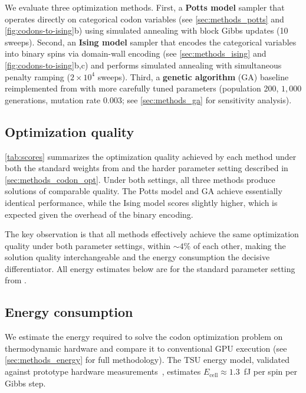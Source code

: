 \documentclass[11pt,twocolumn]{article}
\begin{document}
We evaluate three optimization methods.
First, a \textbf{Potts model} sampler that operates directly on categorical codon variables (see \cref{sec:methods_potts} and \cref{fig:codons-to-ising}b) using simulated annealing with block Gibbs updates (10 sweeps).
Second, an \textbf{Ising model} sampler that encodes the categorical variables into binary spins via domain-wall encoding (see \cref{sec:methods_ising} and \cref{fig:codons-to-ising}b,c) and performs simulated annealing with simultaneous penalty ramping ($2 \times 10^4$ sweeps).
Third, a \textbf{genetic algorithm} (GA) baseline reimplemented from \cite{fox2021mrna} with more carefully tuned parameters (population 200, $1{,}000$ generations, mutation rate $0.003$; see \cref{sec:methods_ga} for sensitivity analysis).

\subsection{Optimization quality}\label{sec:results_quality}

\cref{tab:scores} summarizes the optimization quality achieved by each method under both the standard weights from \cite{fox2021mrna} and the harder parameter setting described in \cref{sec:methods_codon_opt}.
Under both settings, all three methods produce solutions of comparable quality.
The Potts model and GA achieve essentially identical performance, while the Ising model scores slightly higher, which is expected given the overhead of the binary encoding.

The key observation is that all methods effectively achieve the same optimization quality under both parameter settings, within ${\sim}4\%$ of each other, making the solution quality interchangeable and the energy consumption the decisive differentiator.
All energy estimates below are for the standard parameter setting from \cite{fox2021mrna}.

\subsection{Energy consumption}\label{sec:results_energy}

We estimate the energy required to solve the codon optimization problem on thermodynamic hardware and compare it to conventional GPU execution (see \cref{sec:methods_energy} for full methodology).
The TSU energy model, validated against prototype hardware measurements~\cite{jelincic2025dtm}, estimates $E_\text{cell} \approx 1.3$~fJ per spin per Gibbs step.
\end{document}
